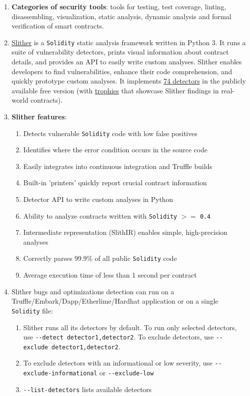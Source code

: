 \begin{enumerate}
\item\textbf{Categories of security tools}: tools for testing, test coverage, linting, disassembling, visualization, static analysis, dynamic analysis and formal verification of smart contracts.

\item\href{https://github.com/crytic/slither}{Slither} is a \verb|Solidity| static analysis framework written in Python 3. It runs a suite of vulnerability detectors, prints visual information about contract details, and provides an API to easily write custom analyses. Slither enables developers to find vulnerabilities, enhance their code comprehension, and quickly prototype custom analyses. It implements \href{https://github.com/crytic/slither\#detectors}{74 detectors} in the publicly available free version (with \href{https://github.com/crytic/slither/blob/master/trophies.md}{trophies} that showcase Slither findings in real-world contracts).

\item\textbf{Slither features}:
	\begin{enumerate}
	\item Detects vulnerable \verb|Solidity| code with low false positives
	\item Identifies where the error condition occurs in the source code
	\item Easily integrates into continuous integration and Truffle builds
	\item Built-in 'printers' quickly report crucial contract information
	\item Detector API to write custom analyses in Python
	\item Ability to analyze contracts written with \verb|Solidity| $>=$ \verb|0.4|
	\item Intermediate representation (SlithIR) enables simple, high-precision analyses
	\item Correctly parses 99.9\% of all public \verb|Solidity| code
	\item Average execution time of less than 1 second per contract
	\end{enumerate}

\item Slither bugs and optimizations detection can run on a Truffle/Embark/Dapp/Etherlime/Hardhat application or on a single \verb|Solidity| file:
	\begin{enumerate}
	\item Slither runs all its detectors by default. To run only selected detectors, use \verb|--detect detector1,detector2|. To exclude detectors, use \verb|--exclude detector1,detector2|.
	\item To exclude detectors with an informational or low severity, use \verb|--exclude-informational| or \verb|--exclude-low|
	\item \verb|--list-detectors| lists available detectors
	\end{enumerate}


\end{enumerate}
